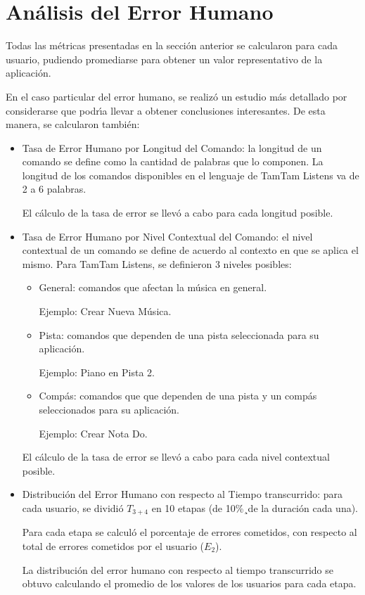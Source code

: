 \section{An\'alisis del Error Humano}
\label{sec:evaluacionError}
Todas las m\'etricas presentadas en la secci\'on anterior se calcularon para cada usuario,
pudiendo promediarse para obtener un valor representativo de la aplicaci\'on.

En el caso particular del error humano, se realiz\'o un estudio m\'as detallado
por considerarse que podr{\'\i}a llevar a obtener conclusiones interesantes. De esta manera,
se calcularon tambi\'en:

\begin{itemize}
	\item Tasa de Error Humano por Longitud del Comando: la longitud de un comando se define
	como la cantidad de palabras que lo componen. La longitud de los comandos disponibles en el 
	lenguaje de TamTam Listens va de 2 a 6 palabras.

	El c\'alculo de la tasa de error se llev\'o a cabo para cada longitud posible.  


	\item Tasa de Error Humano por Nivel Contextual del Comando: el nivel contextual de un comando
	se define de acuerdo al contexto en que se aplica el mismo.
	Para TamTam Listens, se definieron 3 niveles posibles:
		\begin{itemize}
			\item General: comandos que afectan la m\'usica en general. 

			Ejemplo: Crear Nueva M\'usica.
			\item Pista: comandos que dependen de una pista seleccionada para su aplicaci\'on. 

			Ejemplo: Piano en Pista 2.
			\item Comp\'as: comandos que que dependen de una pista y un comp\'as seleccionados 
			para su aplicaci\'on. 

			Ejemplo: Crear Nota Do.
		\end{itemize}
	
		
	El c\'alculo de la tasa de error se llev\'o a cabo para cada nivel contextual posible.
	\item Distribuci\'on del Error Humano con respecto al Tiempo transcurrido: para cada usuario, 
	se dividi\'o $T_{3+4}$ en 10 etapas (de 10\%¸de la duraci\'on cada una).

	Para cada etapa se calcul\'o el porcentaje de errores cometidos, con respecto al total de
	errores cometidos por el usuario ($E_2$).

	La distribuci\'on del error humano con respecto al tiempo transcurrido se obtuvo calculando 
	el promedio de los valores de los usuarios para cada etapa.  
\end{itemize}